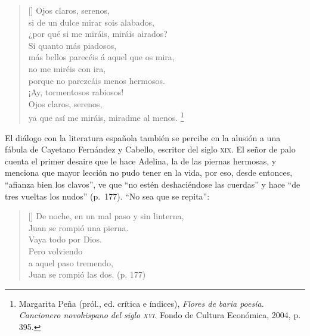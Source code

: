 \documentclass[14pt,twoside,final]{extbook} %
\let\oldfootnote\footnote
\renewcommand\footnote[1]{%
\oldfootnote{\hspace{1mm}#1}}
\begin{document}
\begin{verse}[\versewidth]
Ojos claros, serenos, \\
si de un dulce mirar sois alabados, \\
¿por qué si me miráis, miráis airados? \\
Si quanto más piadosos, \\
más bellos parecéis á aquel que os mira, \\
no me miréis con ira, \\
porque no parezcáis menos hermosos. \\
¡Ay, tormentosos rabiosos! \\
Ojos claros, serenos, \\
ya que así me miráis, miradme al menos.\footnote{Margarita Peña (pról., ed. crítica e índices), \emph{Flores de baria poesía. Cancionero novohispano del siglo \textsc{xvi}.} Fondo de Cultura Económica, 2004, p. 395.}
\end{verse}
El diálogo con la literatura española también se percibe en la alusión a una fábula de Cayetano Fernández y Cabello, escritor del siglo \textsc{xix}. El señor de palo cuenta el primer desaire que le hace Adelina, la de las piernas hermosas, y menciona que mayor lección no pudo tener en la vida, por eso, desde entonces, ``afianza bien los clavos'', ve que ``no estén deshaciéndose las cuerdas'' y hace ``de tres vueltas los nudos'' (p.~177). ``No sea que se repita'':\pagebreak[4]
\settowidth{\versewidth}{De noche, en un mal paso y sin linterna,}
\begin{verse}[\versewidth]
De noche, en un mal paso y sin linterna, \\
Juan se rompió una pierna. \\
Vaya todo por Dios. \\
Pero volviendo \\
a aquel paso tremendo, \\
Juan se rompió las dos. (p. 177)
\end{verse}
\end{document}
